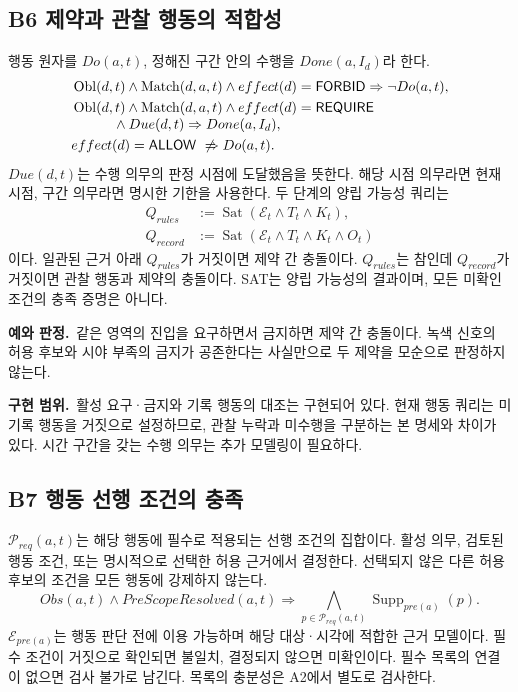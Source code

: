 \documentclass[11pt,a4paper]{article}
\newcommand{\pred}[1]{\mathsf{#1}}
\newcommand{\E}{\mathcal{E}}
\newcommand{\sat}{\operatorname{Sat}}
\newcommand{\supp}{\operatorname{Supp}}
\newcommand{\match}{\operatorname{Match}}
\newcommand{\obl}{\operatorname{Obl}}
\newcommand{\example}{\par\textbf{예와 판정.}\ }
\newcommand{\impl}{\par\textbf{구현 범위.}\ }
\begin{document}
\subsection{B6 제약과 관찰 행동의 적합성}\label{prop:b6}
행동 원자를 $Do(a,t)$, 정해진 구간 안의 수행을 $Done(a,I_d)$라 한다.
\begin{align}
 &\obl(d,t)\land\match(d,a,t)\land effect(d)=\pred{FORBID}
   \Rightarrow\neg Do(a,t),\label{eq:b6forbid}\\
 &\obl(d,t)\land\match(d,a,t)\land effect(d)=\pred{REQUIRE}\notag\\[-0.3em]
 &\hspace{3em}\land Due(d,t)\Rightarrow Done(a,I_d),\label{eq:b6require}\\
 &effect(d)=\pred{ALLOW}\ \not\Rightarrow Do(a,t).
\end{align}
$Due(d,t)$는 수행 의무의 판정 시점에 도달했음을 뜻한다.
해당 시점 의무라면 현재 시점, 구간 의무라면 명시한 기한을 사용한다.
두 단계의 양립 가능성 쿼리는
\begin{align}
 Q_{rules}&:=\sat(\E_t\land T_t\land K_t),\\
 Q_{record}&:=\sat(\E_t\land T_t\land K_t\land O_t)
\end{align}
이다. 일관된 근거 아래 $Q_{rules}$가 거짓이면 제약 간 충돌이다.
$Q_{rules}$는 참인데 $Q_{record}$가 거짓이면 관찰 행동과 제약의 충돌이다.
SAT는 양립 가능성의 결과이며, 모든 미확인 조건의 충족 증명은 아니다.

\example 같은 영역의 진입을 요구하면서 금지하면 제약 간 충돌이다.
녹색 신호의 허용 후보와 시야 부족의 금지가 공존한다는 사실만으로
두 제약을 모순으로 판정하지 않는다.
\impl 활성 요구·금지와 기록 행동의 대조는 구현되어 있다.
현재 행동 쿼리는 미기록 행동을 거짓으로 설정하므로,
관찰 누락과 미수행을 구분하는 본 명세와 차이가 있다.
시간 구간을 갖는 수행 의무는 추가 모델링이 필요하다.

\subsection{B7 행동 선행 조건의 충족}\label{prop:b7}
$\mathcal{P}_{req}(a,t)$는 해당 행동에 필수로 적용되는 선행 조건의 집합이다.
활성 의무, 검토된 행동 조건, 또는 명시적으로 선택한 허용 근거에서 결정한다.
선택되지 않은 다른 허용 후보의 조건을 모든 행동에 강제하지 않는다.
\begin{equation}
 Obs(a,t)\land PreScopeResolved(a,t)
 \Rightarrow\bigwedge_{p\in\mathcal{P}_{req}(a,t)}\supp_{pre(a)}(p).
 \label{eq:b7}
\end{equation}
$\E_{pre(a)}$는 행동 판단 전에 이용 가능하며 해당 대상·시각에 적합한 근거 모델이다.
필수 조건이 거짓으로 확인되면 불일치, 결정되지 않으면 미확인이다.
필수 목록의 연결이 없으면 검사 불가로 남긴다.
목록의 충분성은 A2에서 별도로 검사한다.
\end{document}
